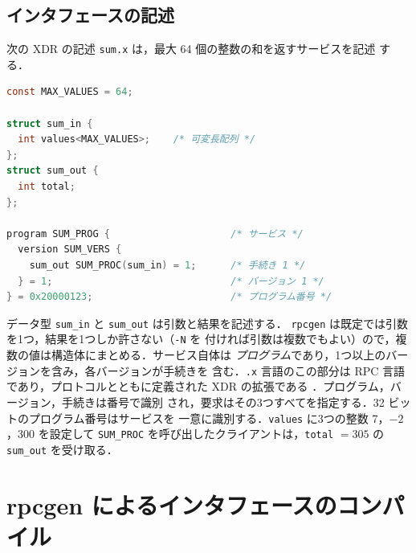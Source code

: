 \documentclass[../main.tex]{subfiles}
\begin{document}
\subsection{インタフェースの記述}

次の XDR の記述 \texttt{sum.x} は，最大 64 個の整数の和を返すサービスを記述
する．

\begin{lstlisting}[language=C, numbers=none]
const MAX_VALUES = 64;

struct sum_in {
  int values<MAX_VALUES>;    /* 可変長配列 */
};
struct sum_out {
  int total;
};

program SUM_PROG {                     /* サービス */
  version SUM_VERS {
    sum_out SUM_PROC(sum_in) = 1;      /* 手続き 1 */
  } = 1;                               /* バージョン 1 */
} = 0x20000123;                        /* プログラム番号 */
\end{lstlisting}

データ型 \texttt{sum\_in} と \texttt{sum\_out} は引数と結果を記述する．
\texttt{rpcgen} は既定では引数を1つ，結果を1つしか許さない（\texttt{-N} を
付ければ引数は複数でもよい）ので，複数の値は構造体にまとめる．サービス自体は
\emph{プログラム}であり，1つ以上のバージョンを含み，各バージョンが手続きを
含む．\texttt{.x} 言語のこの部分は RPC 言語であり，プロトコルとともに定義された
XDR の拡張である \cite{rfc5531}．プログラム，バージョン，手続きは番号で識別
され，要求はその3つすべてを指定する．32 ビットのプログラム番号はサービスを
一意に識別する．\texttt{values} に3つの整数 7，$-2$，300 を設定して
\texttt{SUM\_PROC} を呼び出したクライアントは，\texttt{total} $=305$ の
\texttt{sum\_out} を受け取る．

\section{rpcgen によるインタフェースのコンパイル}
\label{sec:l13-rpcgen}
\end{document}
